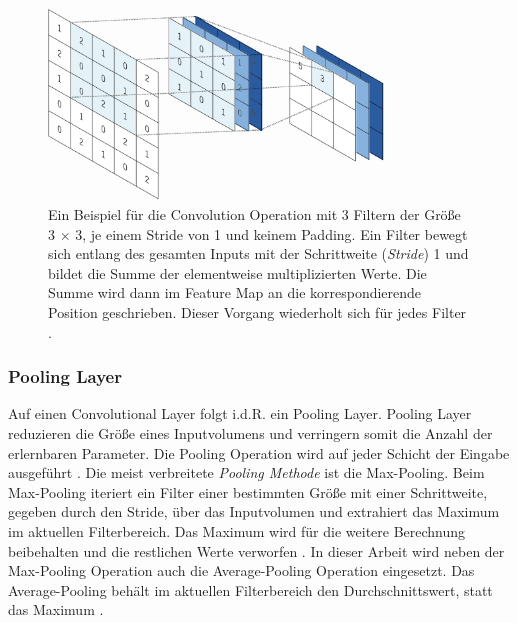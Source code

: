 \pagebreak
\vspace*{\fill}
\begin{figure}[H]
	\centering
	\includegraphics[width=0.8\textwidth]{images/ann_conv/convolution_layer.png}
	\caption{Ein Beispiel für die Convolution Operation mit 3 Filtern der Größe 3 $\times$ 3, je einem Stride von 1 und keinem Padding. Ein Filter bewegt sich entlang des gesamten Inputs mit der Schrittweite (\textit{Stride}) 1 und bildet die Summe der elementweise multiplizierten Werte. Die Summe wird dann im Feature Map an die korrespondierende Position geschrieben. Dieser Vorgang wiederholt sich für jedes Filter \cite{yamashitaConvolutionalNeuralNetworks2018}. }
	\label{fig:convolution_layer}
\end{figure}
\vspace*{\fill}
\pagebreak
\subsubsection{Pooling Layer}
Auf einen Convolutional Layer folgt i.d.R. ein Pooling Layer. Pooling Layer reduzieren die Größe eines Inputvolumens und verringern somit die Anzahl der erlernbaren Parameter. Die Pooling Operation wird auf jeder Schicht der Eingabe ausgeführt \cite{CS231nConvolutionalNeurala}. Die meist verbreitete \textit{Pooling Methode} ist die Max-Pooling. Beim Max-Pooling iteriert ein Filter einer bestimmten Größe mit einer Schrittweite, gegeben durch den Stride, über das Inputvolumen und extrahiert das Maximum im aktuellen Filterbereich. Das Maximum wird für die weitere Berechnung beibehalten und die restlichen Werte verworfen
 \cite{CS231nConvolutionalNeurala}. In dieser Arbeit wird neben der Max-Pooling Operation auch die Average-Pooling Operation eingesetzt. Das Average-Pooling behält im aktuellen Filterbereich den Durchschnittswert, statt das Maximum \cite{CS231nConvolutionalNeurala}.
 

